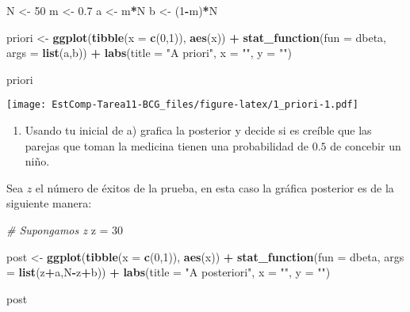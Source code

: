 \documentclass[]{article}
\newenvironment{Shaded}{\begin{snugshade}}{\end{snugshade}}
\newcommand{\CommentTok}[1]{\textcolor[rgb]{0.56,0.35,0.01}{\textit{#1}}}
\newcommand{\DataTypeTok}[1]{\textcolor[rgb]{0.13,0.29,0.53}{#1}}
\newcommand{\DecValTok}[1]{\textcolor[rgb]{0.00,0.00,0.81}{#1}}
\newcommand{\FloatTok}[1]{\textcolor[rgb]{0.00,0.00,0.81}{#1}}
\newcommand{\KeywordTok}[1]{\textcolor[rgb]{0.13,0.29,0.53}{\textbf{#1}}}
\newcommand{\NormalTok}[1]{#1}
\newcommand{\OperatorTok}[1]{\textcolor[rgb]{0.81,0.36,0.00}{\textbf{#1}}}
\newcommand{\StringTok}[1]{\textcolor[rgb]{0.31,0.60,0.02}{#1}}
\providecommand{\tightlist}{%
  \setlength{\itemsep}{0pt}\setlength{\parskip}{0pt}}
\begin{document}
\begin{Shaded}
\begin{Highlighting}[]
\NormalTok{N <-}\StringTok{  }\DecValTok{50}
\NormalTok{m <-}\StringTok{  }\FloatTok{0.7}
\NormalTok{a <-}\StringTok{  }\NormalTok{m}\OperatorTok{*}\NormalTok{N}
\NormalTok{b <-}\StringTok{  }\NormalTok{(}\DecValTok{1}\OperatorTok{-}\NormalTok{m)}\OperatorTok{*}\NormalTok{N}

\NormalTok{priori <-}\StringTok{ }\KeywordTok{ggplot}\NormalTok{(}\KeywordTok{tibble}\NormalTok{(}\DataTypeTok{x =} \KeywordTok{c}\NormalTok{(}\DecValTok{0}\NormalTok{,}\DecValTok{1}\NormalTok{)), }\KeywordTok{aes}\NormalTok{(x)) }\OperatorTok{+}
\StringTok{  }\KeywordTok{stat_function}\NormalTok{(}\DataTypeTok{fun =}\NormalTok{ dbeta, }\DataTypeTok{args =} \KeywordTok{list}\NormalTok{(a,b)) }\OperatorTok{+}
\StringTok{  }\KeywordTok{labs}\NormalTok{(}\DataTypeTok{title =} \StringTok{"A priori"}\NormalTok{,}
    \DataTypeTok{x =} \StringTok{""}\NormalTok{,}
    \DataTypeTok{y =} \StringTok{""}\NormalTok{)}

\NormalTok{priori}
\end{Highlighting}
\end{Shaded}

\texttt{[image: EstComp-Tarea11-BCG\_files/figure-latex/1\_priori-1.pdf]}

\begin{enumerate}
\def\labelenumi{\alph{enumi})}
\setcounter{enumi}{1}
\tightlist
\item
  Usando tu inicial de a) grafica la posterior y decide si es creíble
  que las parejas que toman la medicina tienen una probabilidad de
  \(0.5\) de concebir un niño.
\end{enumerate}

Sea \(z\) el número de éxitos de la prueba, en esta caso la gráfica
posterior es de la siguiente manera:

\begin{Shaded}
\begin{Highlighting}[]
\CommentTok{# Supongamos z}
\NormalTok{z =}\StringTok{ }\DecValTok{30}

\NormalTok{post <-}\StringTok{ }\KeywordTok{ggplot}\NormalTok{(}\KeywordTok{tibble}\NormalTok{(}\DataTypeTok{x =} \KeywordTok{c}\NormalTok{(}\DecValTok{0}\NormalTok{,}\DecValTok{1}\NormalTok{)), }\KeywordTok{aes}\NormalTok{(x)) }\OperatorTok{+}
\StringTok{  }\KeywordTok{stat_function}\NormalTok{(}\DataTypeTok{fun =}\NormalTok{ dbeta, }\DataTypeTok{args =} \KeywordTok{list}\NormalTok{(z}\OperatorTok{+}\NormalTok{a,N}\OperatorTok{-}\NormalTok{z}\OperatorTok{+}\NormalTok{b)) }\OperatorTok{+}
\StringTok{  }\KeywordTok{labs}\NormalTok{(}\DataTypeTok{title =} \StringTok{"A posteriori"}\NormalTok{,}
    \DataTypeTok{x =} \StringTok{""}\NormalTok{,}
    \DataTypeTok{y =} \StringTok{""}\NormalTok{)}

\NormalTok{post}
\end{Highlighting}
\end{Shaded}
\end{document}
